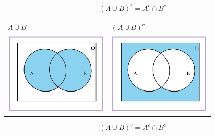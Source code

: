 \documentclass[
  letterpaper,
  DIV=11,
  numbers=noendperiod]{scrreprt}
\begin{document}
\[(A\cup B)^c=A^c\cap B^c\]

\begin{longtable}[]{@{}
  >{\centering\arraybackslash}p{}
  >{\centering\arraybackslash}p{}@{}}
\toprule\noalign{}
\begin{minipage}[b]{\linewidth}\centering
\(A\cup B\)
\end{minipage} & \begin{minipage}[b]{\linewidth}\centering
\((A\cup B)^c\)
\end{minipage} \\
\midrule\noalign{}
\endhead
\bottomrule\noalign{}
\endlastfoot
\includegraphics[width=\linewidth,height=1.5625in,keepaspectratio]{Images/proba1dibujos/demorgan6.jpg}
&
\includegraphics[width=\linewidth,height=1.5625in,keepaspectratio]{Images/proba1dibujos/demorgan7.jpg} \\
\end{longtable}

\[(A\cup B)^c=A^c\cap B^c\]
\end{document}
